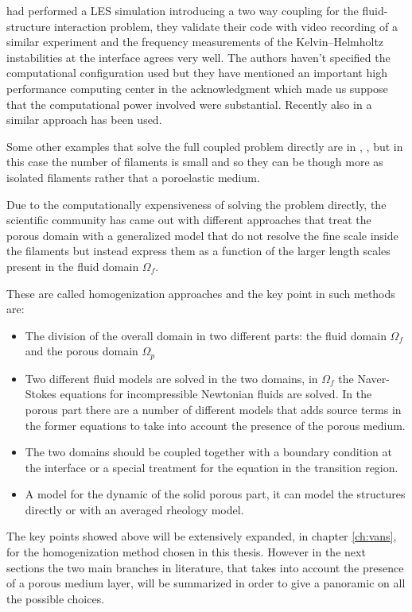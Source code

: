 \citet{dupont2010modelling} had performed a LES simulation introducing a two way coupling for the fluid-structure interaction problem, they validate their code with video recording of a similar experiment and the frequency measurements of the Kelvin–Helmholtz instabilities at the interface agrees very well.
The authors haven't specified the computational configuration used but they have mentioned an important high performance computing center in the acknowledgment which made us suppose that the computational power involved were substantial.
Recently also in \citet{marjoribanks2017does} a similar approach has been used.

Some other examples that solve the full coupled problem directly are in \citet{pinelli2017pelskin}, \citet{favier2017pelskin}, \citet{revell2017pelskin} but in this case the number of filaments is small and so they can be though more as isolated filaments rather that a poroelastic medium.

Due to the computationally expensiveness of solving the problem directly, the scientific community has came out with different approaches that treat the porous domain with a generalized model that do not resolve the fine scale inside the filaments but instead express them as a function of the larger length scales present in the fluid domain $\Omega_{f}$.

These are called homogenization approaches and the key point in such methods are:
\begin{itemize}
	\item The division of the overall domain in two different parts: the fluid domain $\Omega_{f}$ and the porous domain $\Omega_{p}$
	\item Two different fluid models are solved in the two domains, in $\Omega_{f}$ the Naver-Stokes equations for incompressible Newtonian fluids are solved. In the porous part there are a number of different models that adds source terms in the former equations to take into account the presence of the porous medium.
	\item The two domains should be coupled together with a boundary condition at the interface or a special treatment for the equation in the transition region.
	\item A model for the dynamic of the solid porous part, it can model the structures directly or with an averaged rheology model.
\end{itemize}

The key points showed above will be extensively expanded, in chapter \ref{ch:vans}, for the homogenization method chosen in this thesis.
However in the next sections the two main branches in literature, that takes into account the presence of a porous medium layer, will be summarized in order to give a panoramic on all the possible choices.


